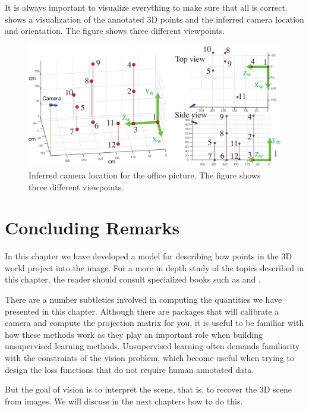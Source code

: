 It is always important to visualize everything to make sure that all is correct. \Fig{\ref{fig:result_toymodel_3dscene_and_estimated_camera}} shows a visualization of the annotated 3D points and the inferred camera location and orientation. The figure shows three different viewpoints. 

\begin{figure}[t]
\centerline{
\includegraphics[width=1\linewidth]{figures/imaging_geometry/result_toymodel_3dscene_and_estimated_camera_b.eps}
}
\caption{Inferred camera location for the office picture. The figure shows three different viewpoints.}
\label{fig:result_toymodel_3dscene_and_estimated_camera}
\end{figure}


\section{Concluding Remarks}


In this chapter we have developed a model for describing how points in the 3D world project into the image.
For a more in depth study of the topics described in this chapter, the reader should consult specialized books such as \cite{Trucco1998} and \cite{Hartley2004}.

There are a number subtleties involved in computing the quantities we have presented in this chapter. Although there are packages that will calibrate a camera and compute the projection matrix for you, it is useful to be familiar with how these methods work as they play an important role when building unsupervised learning methods. Unsupervised learning often demands familiarity with the constraints of the vision problem, which become useful when trying to design the loss functions that do not require human annotated data.

But the goal of vision is to interpret the scene, that is, to recover the 3D scene from images. We will discuss in the next chapters how to do this.

 